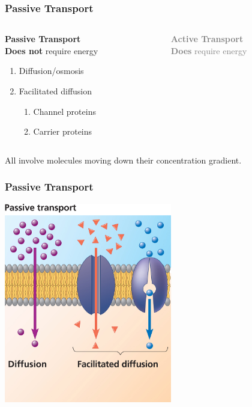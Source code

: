 \documentclass[10pt]{beamer}
\begin{document}
\begin{frame}[t]
\frametitle{Passive Transport}
\vspace{1.0cm}

	\begin{columns}[t]
		\begin{column}{0.5\textwidth}
			\Large{\textbf{\textcolor{myblue2}{Passive Transport}}}\normalsize{}\\
			\medskip
			\textbf{Does not} require energy\\
				\begin{enumerate}
					\item Diffusion/osmosis
					\item Facilitated diffusion
						\begin{enumerate}
							\item Channel proteins
							\item Carrier proteins
						\end{enumerate}
				\end{enumerate}
		\end{column}
		
		\begin{column}{0.5\textwidth}
			\Large{\textbf{\textcolor{gray}{Active Transport}}}\normalsize{}\\
			\medskip
			\textcolor{gray}{\textbf{Does} require energy}\\
		\end{column}
	\end{columns}
	
	\vspace{1.0cm} 
	
	All involve molecules moving down their concentration gradient.
\end{frame}


\begin{frame}
\frametitle{Passive Transport}

	\begin{center}
		\includegraphics[width=0.55\textwidth]{figures/fg07_16a.jpg}
	\end{center}
\end{frame}
\end{document}
